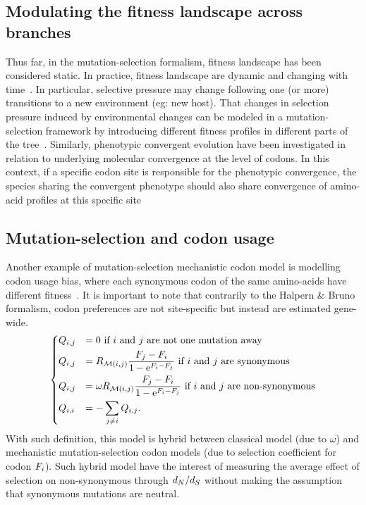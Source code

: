 \subsection{Modulating the fitness landscape across branches}
\label{subsec:modulating-the-fitness-landscape-across-branches}

Thus far, in the mutation-selection formalism, fitness landscape has been considered static.
In practice, fitness landscape are dynamic and changing with time~\citep{Naumenko2012, Bazykin2015}.
In particular, selective pressure may change following one (or more) transitions to a new environment (eg: new host).
That changes in selection pressure induced by environmental changes can be modeled in a mutation-selection framework by introducing different fitness profiles in different parts of the tree~\citep{Tamuri2009}.
Similarly, phenotypic convergent evolution have been investigated in relation to underlying molecular convergence at the level of codons.
In this context, if a specific codon site is responsible for the phenotypic convergence, the species sharing the convergent phenotype should also share convergence of amino-acid profiles at this specific site~\citep{Parto2018,Parto2018a}

\subsection{Mutation-selection and codon usage}
\label{subsec:model-codon-usage}

Another example of mutation-selection mechanistic codon model is modelling codon usage bias, where each synonymous codon of the same amino-acids have different fitness~\citep{Yang2008}.
It is important to note that contrarily to the Halpern \& Bruno formalism, codon preferences are not site-specific but instead are estimated gene-wide.
\begin{equation}
    \begin{dcases}
        Q_{{i}, {j}} & = 0 \text{ if ${i}$ and ${j}$ are not one mutation away} \\
        Q_{{i}, {j}} & = R_{\mathcal{M}({i}, {j})} \dfrac{F_{{j}} - F_{{i}}}{1 - \mathrm{e}^{F_{{i}} - F_{{j}}} }\text{ if ${i}$ and ${j}$ are synonymous} \\
        Q_{{i}, {j}} & = \omega R_{\mathcal{M}({i}, {j})} \dfrac{F_{{j}} - F_{{i}}}{1 - \mathrm{e}^{F_{{i}} - F_{{j}}} } \text{ if ${i}$ and ${j}$ are non-synonymous} \\
        Q_{{i}, {i}} & = - \sum\limits_{{j} \neq {i}} Q_{{i}, {j}}.
    \end{dcases}
    \label{eq:yang-codon-models}
\end{equation}
With such definition, this model is hybrid between classical model (due to $\omega$) and mechanistic mutation-selection codon models (due to selection coefficient for codon $F_{{i}}$).
Such hybrid model have the interest of measuring the average effect of selection on non-synonymous through $d_N / d_S$ without making the assumption that synonymous mutations are neutral.


